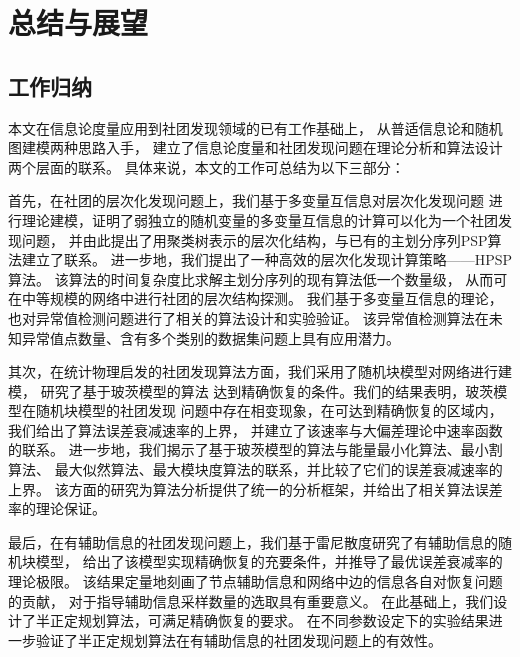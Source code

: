 \chapter{总结与展望}\label{chp:summary}
\section{工作归纳}
本文在信息论度量应用到社团发现领域的已有工作基础上，
从普适信息论和随机图建模两种思路入手，
建立了信息论度量和社团发现问题在理论分析和算法设计两个层面的联系。
具体来说，本文的工作可总结为以下三部分：

首先，在社团的层次化发现问题上，我们基于多变量互信息对层次化发现问题
进行理论建模，证明了弱独立的随机变量的多变量互信息的计算可以化为一个社团发现问题，
并由此提出了用聚类树表示的层次化结构，与已有的主划分序列PSP算法建立了联系。
进一步地，我们提出了一种高效的层次化发现计算策略——HPSP算法。
该算法的时间复杂度比求解主划分序列的现有算法低一个数量级，
从而可在中等规模的网络中进行社团的层次结构探测。
我们基于多变量互信息的理论，也对异常值检测问题进行了相关的算法设计和实验验证。
该异常值检测算法在未知异常值点数量、含有多个类别的数据集问题上具有应用潜力。

其次，在统计物理启发的社团发现算法方面，我们采用了随机块模型对网络进行建模，
研究了基于玻茨模型的算法
达到精确恢复的条件。我们的结果表明，玻茨模型在随机块模型的社团发现
问题中存在相变现象，在可达到精确恢复的区域内，我们给出了算法误差衰减速率的上界，
并建立了该速率与大偏差理论中速率函数的联系。
进一步地，我们揭示了基于玻茨模型的算法与能量最小化算法、最小割算法、
最大似然算法、最大模块度算法的联系，并比较了它们的误差衰减速率的上界。
该方面的研究为算法分析提供了统一的分析框架，并给出了相关算法误差率的理论保证。

最后，在有辅助信息的社团发现问题上，我们基于雷尼散度研究了有辅助信息的随机块模型，
给出了该模型实现精确恢复的充要条件，并推导了最优误差衰减率的理论极限。
该结果定量地刻画了节点辅助信息和网络中边的信息各自对恢复问题的贡献，
对于指导辅助信息采样数量的选取具有重要意义。
在此基础上，我们设计了半正定规划算法，可满足精确恢复的要求。
在不同参数设定下的实验结果进一步验证了半正定规划算法在有辅助信息的社团发现问题上的有效性。


